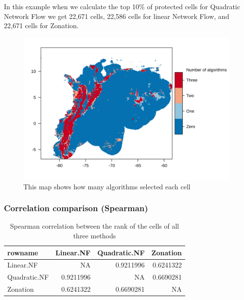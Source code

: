 \documentclass[]{article}
\begin{document}
In this example when we calculate the top 10\% of protected cells for Quadratic Network Flow we get 22,671 cells, 22,586 cells for linear Network Flow, and 22,671 cells for Zonation.

\begin{figure}
\centering
\includegraphics{NFPaper_files/figure-latex/NumberOfTimes-1.png}
\caption{\label{fig:NumberOfTimes}This map shows how many algorithms selected each cell}
\end{figure}

\hypertarget{correlation-comparison-spearman}{%
\subsubsection{Correlation comparison (Spearman)}\label{correlation-comparison-spearman}}

\begin{table}

\caption{\label{tab:Corr}Spearman correlation between the rank of the cells of all three methods}
\centering
\begin{tabular}[t]{lrrr}
\toprule
rowname & Linear.NF & Quadratic.NF & Zonation\\
\midrule
Linear.NF & NA & 0.9211996 & 0.6241322\\
Quadratic.NF & 0.9211996 & NA & 0.6690281\\
Zonation & 0.6241322 & 0.6690281 & NA\\
\bottomrule
\end{tabular}
\end{table}
\end{document}

